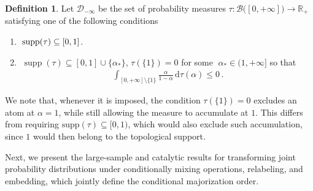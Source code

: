 \documentclass[aps,pra,11pt,onecolumn,nofootinbib,tightenlines]{revtex4-2}
\theoremstyle{definition}
\newtheorem{definition}[theorem]{Definition}
\newcommand{\D}{\mathcal{D}}
\newcommand{\mc}[1]{\mathcal{#1}}
\newcommand{\mb}[1]{\mathbb{#1}}
\begin{document}
\begin{definition}
\label{def: D_infty}
 Let \(\D_{-\infty}\) be the set of probability measures $\tau:\mc B\big([0,+\infty]\big)\to\mb R_+$ satisfying one of the following conditions
    \begin{enumerate}[itemsep=0pt,topsep=5pt]
    \item  $\;\textup{supp}(\tau) \subseteq [0,1]$.
    \item $\;\operatorname{supp}(\tau) \subseteq [0,1] \cup \{\alpha_*\}$, $\tau(\{1\})=0$  for some $\;\alpha_* \in (1, +\infty]$ so that
    \begin{align}
        \;\displaystyle\int_{[0,+\infty]\setminus\{1\}} \frac{\alpha}{1 - \alpha} \, \mathrm{d}\tau(\alpha) \leq 0\,.
    \end{align}
\end{enumerate}
\end{definition}
We note that, whenever it is imposed, the condition $\tau(\{1\})=0$
excludes an atom at $\alpha=1$, while still allowing the measure to
accumulate at $1$. This differs from requiring
$\text{supp}(\tau)\subseteq[0,1)$, which would also exclude such accumulation,
since $1$ would then belong to the topological support.


Next, we present the large-sample and catalytic results for transforming joint probability distributions under conditionally mixing operations, relabeling, and embedding, which jointly define the conditional majorization order.
\end{document}
